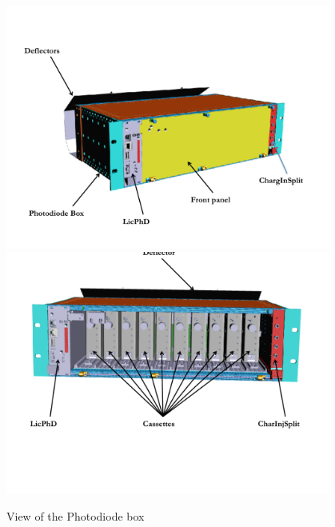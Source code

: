 
\begin{figure}[htbp]
\centering
\includegraphics[height=8cm]{figures/Photodiodebox.pdf}
\includegraphics[height=8cm]{figures/Photodiodebox2.pdf}
\caption{View of the Photodiode box}\label{fig:lasphotodiodebox}
\end{figure}

